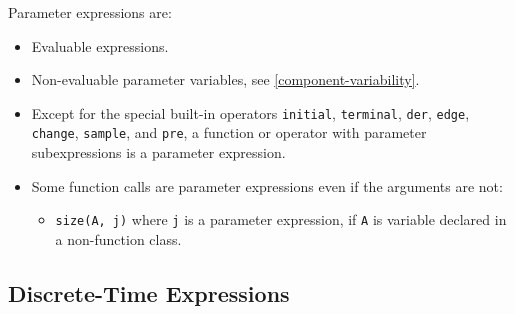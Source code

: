 Parameter expressions are:
\begin{itemize}
\item
  Evaluable expressions.
\item
  Non-evaluable parameter variables, see \cref{component-variability}.
\item
  Except for the special built-in operators \lstinline!initial!, \lstinline!terminal!, \lstinline!der!,
  \lstinline!edge!, \lstinline!change!, \lstinline!sample!, and \lstinline!pre!, a function or operator with parameter
  subexpressions is a parameter expression.
\item
  Some function calls are parameter expressions even if the arguments are not:
  \begin{itemize}
  \item
    \lstinline!size(A, j)! where \lstinline!j! is a parameter expression, if \lstinline!A! is variable declared in a non-function class.
  \end{itemize}
\end{itemize}

\subsection{Discrete-Time Expressions}\label{discrete-time-expressions}

